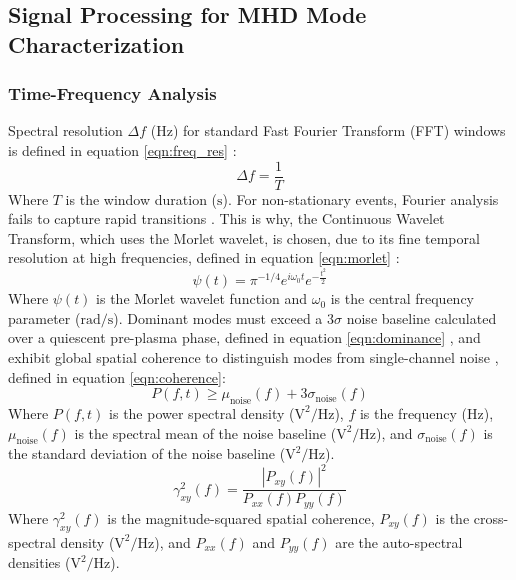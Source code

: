 \subsection{Signal Processing for MHD Mode Characterization}

\subsubsection{Time-Frequency Analysis}
Spectral resolution $\Delta f$ ($\text{Hz}$) for standard Fast Fourier Transform (FFT) windows is defined in equation \ref{eqn:freq_res} \cite{proakis2021digital}:
\begin{equation}
\label{eqn:freq_res}
\Delta f = \frac{1}{T}
\end{equation}
Where $T$ is the window duration ($\text{s}$). For non-stationary events, Fourier analysis fails to capture rapid transitions \cite{boashash2015time}. This is why, the Continuous Wavelet Transform, which uses the Morlet wavelet, is chosen, due to its fine temporal resolution at high frequencies, defined in equation \ref{eqn:morlet} \cite{addison2016illustrated}:
\begin{equation}
\label{eqn:morlet}
\psi(t) = \pi^{-1/4} e^{i \omega_0 t} e^{-\frac{t^2}{2}}
\end{equation}
Where $\psi(t)$ is the Morlet wavelet function  and $\omega_0$ is the central frequency parameter ($\text{rad/s}$). Dominant modes must exceed a $3\sigma$ noise baseline calculated over a quiescent pre-plasma phase, defined in equation \ref{eqn:dominance} \cite{Edlund2018}, and exhibit global spatial coherence to distinguish modes from single-channel noise \cite{KraemerFlecken2024, Singh2024}, defined in equation \ref{eqn:coherence}:
\begin{equation}
\label{eqn:dominance}
P(f, t) \ge \mu_{\text{noise}}(f) + 3\sigma_{\text{noise}}(f)
\end{equation}
Where $P(f, t)$ is the power spectral density ($\text{V}^2/\text{Hz}$), $f$ is the frequency ($\text{Hz}$), $\mu_{\text{noise}}(f)$ is the spectral mean of the noise baseline ($\text{V}^2/\text{Hz}$), and $\sigma_{\text{noise}}(f)$ is the standard deviation of the noise baseline ($\text{V}^2/\text{Hz}$).
\begin{equation}
\label{eqn:coherence}
\gamma_{xy}^2(f) = \frac{|P_{xy}(f)|^2}{P_{xx}(f) P_{yy}(f)}
\end{equation}
Where $\gamma_{xy}^2(f)$ is the magnitude-squared spatial coherence, $P_{xy}(f)$ is the cross-spectral density ($\text{V}^2/\text{Hz}$), and $P_{xx}(f)$ and $P_{yy}(f)$ are the auto-spectral densities ($\text{V}^2/\text{Hz}$).

